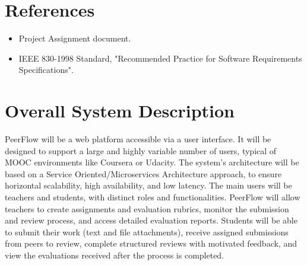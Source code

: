 \section{References}

\begin{justify}
    \begin{itemize}
        \item Project Assignment document.
        \item IEEE 830-1998 Standard, "Recommended Practice for Software Requirements Specifications".
    \end{itemize}
\end{justify}

\section{Overall System Description}

\begin{justify}
    PeerFlow will be a web platform accessible via a user interface. It will be designed to support a large and highly variable number of users, typical of MOOC environments like Coursera or Udacity. The system's architecture will be based on a Service Oriented/Microservices Architecture approach, to ensure horizontal scalability, high availability, and low latency. The main users will be teachers and students, with distinct roles and functionalities. PeerFlow will allow teachers to 
    create assignments and evaluation rubrics, monitor the submission and review process, and access detailed evaluation reports. Students will be able to 
    submit their work (text and file attachments), receive assigned submissions from peers to review, complete structured reviews with motivated feedback, and view the evaluations received after the process is completed.
\end{justify}